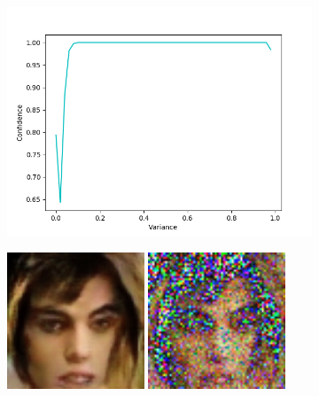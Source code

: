\begin{figure}[h]
	\begin{subfigure}[b]{0.5\textwidth}
		\includegraphics[width=\textwidth]{figures/diversity_gan2_real_dis_gen_images_plot}
	\end{subfigure}
	\begin{subfigure}[b]{0.5\textwidth}
		\centering
		\includegraphics[width=0.45\textwidth]{figures/diversity_gan2_real_dis_gen_imgs_var0}
		\includegraphics[width=0.45\textwidth]{figures/diversity_gan2_real_dis_gen_imgs_var30}

\end{subfigure}
\end{figure}
